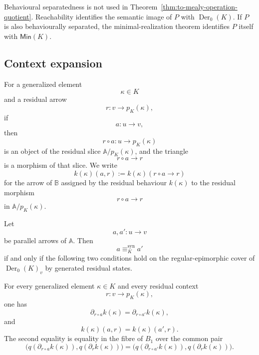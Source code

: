 \begin{remark}
\label{rem:to-separated-realizations-operation-image}
    Behavioural separatedness is not used in
    Theorem~\ref{thm:to-mealy-operation-quotient}. Reachability identifies the
    semantic image of \(P\) with \(\operatorname{Der}_0(K)\). If \(P\) is also
    behaviourally separated, the minimal-realization theorem identifies \(P\)
    itself with \(\mathsf{Min}(K)\).
\end{remark}

\subsection{Context expansion}
\label{subsec:to-context-expansion}

For a generalized element
\[
    \kappa\in K
\]
and a residual arrow
\[
    r:v\to p_K(\kappa),
\]
if
\[
    a:u\to v,
\]
then
\[
    r\circ a:u\to p_K(\kappa)
\]
is an object of the residual slice \(\mathbb A/p_K(\kappa)\), and the
triangle
\[
    r\circ a\to r
\]
is a morphism of that slice. We write
\[
    k(\kappa)(a,r)
    :=
    k(\kappa)(r\circ a\to r)
\]
for the arrow of \(\mathbb B\) assigned by the residual behaviour \(k(\kappa)\)
to the residual morphism
\[
    r\circ a\to r
\]
in \(\mathbb A/p_K(\kappa)\).

\begin{theorem}
\label{thm:to-context-expansion}
    Let
    \[
        a,a':u\to v
    \]
    be parallel arrows of \(\mathbb A\). Then
    \[
        a\equiv^{\mathrm{syn}}_K a'
    \]
    if and only if the following two conditions hold on the regular-epimorphic
    cover of \(\operatorname{Der}_0(K)_v\) by generated residual states.

    For every generalized element \(\kappa\in K\) and every residual context
    \[
        r:v\to p_K(\kappa),
    \]
    one has
    \[
        \partial_{r\circ a}k(\kappa)
        =
        \partial_{r\circ a'}k(\kappa),
    \]
    and
    \[
        k(\kappa)(a,r)=k(\kappa)(a',r).
    \]
    The second equality is equality in the fibre of \(B_1\) over the common
    pair
    \[
    \bigl(
        q(\partial_{r\circ a}k(\kappa)),
        q(\partial_rk(\kappa))
    \bigr)
    =
    \bigl(
        q(\partial_{r\circ a'}k(\kappa)),
        q(\partial_rk(\kappa))
    \bigr).
    \]
\end{theorem}

